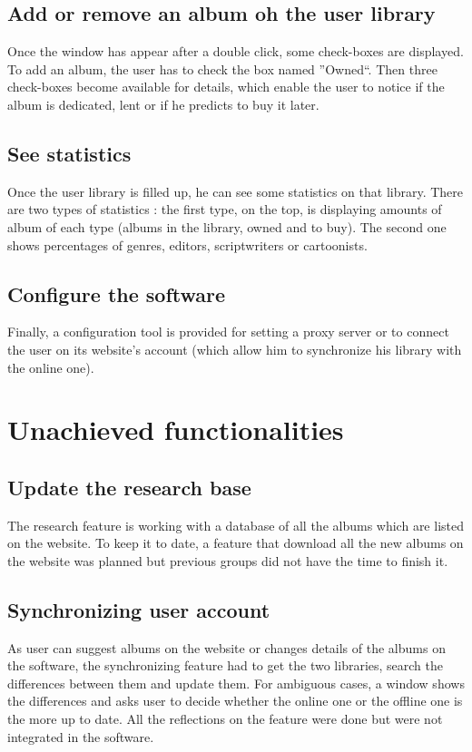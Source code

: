 \documentclass[11pt]{report} %
\begin{document}
%
%

\subsection{Add or remove an album oh the user library}
Once the window has appear after a double click, some check-boxes are displayed. To add an album, the user has to check the box named ''Owned``. Then three check-boxes become available for details, which enable the user to notice if the album is dedicated, lent or if he predicts to buy it later.

\subsection{See statistics}
Once the user library is filled up, he can see some statistics on that library. There are two types of statistics : the first type, on the top, is displaying amounts of album of each type (albums in the library, owned and to buy). The second one shows percentages of genres, editors, scriptwriters or cartoonists.

\subsection{Configure the software}
Finally, a configuration tool is provided for setting a proxy server or to connect the user on its website's account (which allow him to synchronize his library with the online one).

\section{Unachieved functionalities}
\subsection{Update the research base}
The research feature is working with a database of all the albums which are listed on the website. To keep it to date, a feature that download all the new albums on the website was planned but previous groups did not have the time to finish it.

\subsection{Synchronizing user account}
As user can suggest albums on the website or changes details of the albums on the software, the synchronizing feature had to get the two libraries, search the differences between them and update them. For ambiguous cases, a window shows the differences and asks user to decide whether the online one or the offline one is the more up to date. All the reflections on the feature were done but were not integrated in the software.
\end{document}
